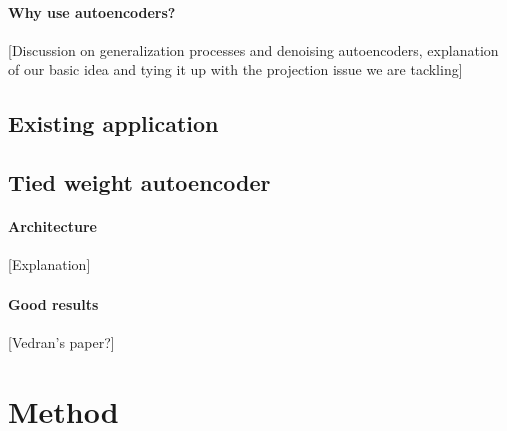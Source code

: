 \documentclass[a4paper,french,11pt]{article}
\begin{document}
\paragraph{Why use autoencoders?}
[Discussion on generalization processes and denoising autoencoders, explanation of our basic idea and tying it up with the projection issue we are tackling]

\subsection{Existing application}

\subsection{Tied weight autoencoder}

\paragraph{Architecture}
[Explanation]

\paragraph{Good results}
[Vedran's paper?]

\section{Method}
\end{document}
